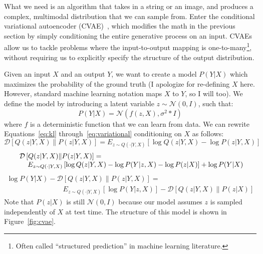 \documentclass[a4paper, 11pt]{article} %
\begin{document}
What we need is an algorithm that takes in a string or an image, and produces a complex, multimodal distribution that we can sample from.
Enter the conditional variational autoencoder (CVAE)~\cite{sohn2015learning,walker2016uncertain}, which modifies the math in the previous section by simply conditioning the entire generative process on an input.
CVAEs allow us to tackle problems where the input-to-output mapping is one-to-many\footnote{Often called ``structured prediction'' in machine learning literature.}, without requiring us to explicitly specify the structure of the output distribution.

Given an input $X$ and an output $Y$, we want to create a model $P(Y|X)$ which maximizes the probability of the ground truth (I apologize for re-defining $X$ here.  However, standard machine learning notation maps $X$ to $Y$, so I will too).  
We define the model by introducing a latent variable $z\sim\mathcal{N}(0,I)$, such that:
\begin{equation}
 P(Y|X)=\mathcal{N}(f(z,X),\sigma^2*I)
\end{equation}
where $f$ is a deterministic function that we can learn from data.  We can rewrite Equations~\ref{eq:kl} through~\ref{eq:variational} conditioning on $X$ as follows:
\begin{equation}
    \mathcal{D}\left[Q(z|Y,X)\|P(z|Y,X)\right]=E_{z\sim Q(\cdot|Y,X)}\left[\log Q(z|Y,X) - \log P(z|Y,X) \right]
\end{equation}
\begin{equation}
\begin{array}{c}
    \mathcal{D}\left[Q(z|Y,X)\|P(z|Y,X)\right]=\hspace{20em}\\
    \hspace{1.5em}E_{z\sim Q(\cdot|Y,X)}\left[\log Q(z|Y,X) - \log P(Y|z,X) - \log P(z|X) \right] + \log P(Y|X)
\end{array}
\end{equation}
\begin{equation}
\begin{array}{c}
    \log P(Y|X) - \mathcal{D}\left[Q(z|Y,X)\|P(z|Y,X)\right]=\hspace{15em}\\
\hspace{8em}E_{z\sim Q(\cdot|Y,X)}\left[\log P(Y|z,X)  \right] - \mathcal{D}\left[Q(z|Y,X)\|P(z|X)\right]
\end{array}
\label{eq:cond_variational}
\end{equation}
Note that $P(z|X)$ is still $\mathcal{N}(0,I)$ because our model assumes $z$ is sampled independently of $X$ at test time.
The structure of this model is shown in Figure~\ref{fig:cvae}.
\end{document}
